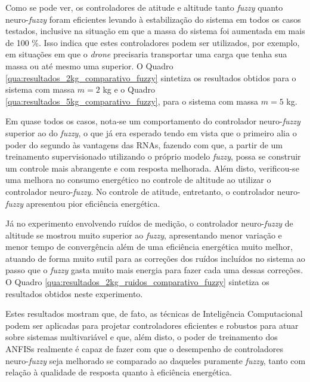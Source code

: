 Como se pode ver, os controladores de atitude e altitude tanto \textit{fuzzy} quanto neuro-\textit{fuzzy} foram eficientes levando à estabilização do sistema em todos os casos testados, inclusive na situação em que a massa do sistema foi aumentada em mais de 100 \%. Isso indica que estes controladores podem ser utilizados, por exemplo, em situações em que o \textit{drone} precisaria transportar uma carga que tenha sua massa ou até mesmo uma superior. O Quadro \ref{qua:resultados_2kg_comparativo_fuzzy} sintetiza os resultados obtidos para o sistema com massa $m=2$ kg e o Quadro \ref{qua:resultados_5kg_comparativo_fuzzy}, para o sistema com massa $m=5$ kg.





Em quase todos os casos, nota-se um comportamento do controlador neuro-\textit{fuzzy} superior ao do \textit{fuzzy}, o que já era esperado tendo em vista que o primeiro alia o poder do segundo às vantagens das RNAs, fazendo com que, a partir de um treinamento supervisionado utilizando o próprio modelo \textit{fuzzy}, possa se construir um controle mais abrangente e com resposta melhorada. Além disto, verificou-se uma melhora no consumo energético no controle de altitude ao utilizar o controlador neuro-\textit{fuzzy}. No controle de atitude, entretanto, o controlador neuro-\textit{fuzzy} apresentou pior eficiência energética.

Já no experimento envolvendo ruídos de medição, o controlador neuro-\textit{fuzzy} de altitude se mostrou muito superior ao \textit{fuzzy}, apresentando menor variação e menor tempo de convergência além de uma eficiência energética muito melhor, atuando de forma muito sutil para as correções dos ruídos incluídos no sistema ao passo que o \textit{fuzzy} gasta muito mais energia para fazer cada uma dessas correções. O Quadro \ref{qua:resultados_2kg_ruidos_comparativo_fuzzy} sintetiza os resultados obtidos neste experimento.



Estes resultados mostram que, de fato, as técnicas de Inteligência Computacional podem ser aplicadas para projetar controladores eficientes e robustos para atuar sobre sistemas multivariável e que, além disto, o poder de treinamento dos ANFISs realmente é capaz de fazer com que o desempenho de controladores neuro-\textit{fuzzy} seja melhorado se comparado ao daqueles puramente \textit{fuzzy}, tanto com relação à qualidade de resposta quanto à eficiência energética.

